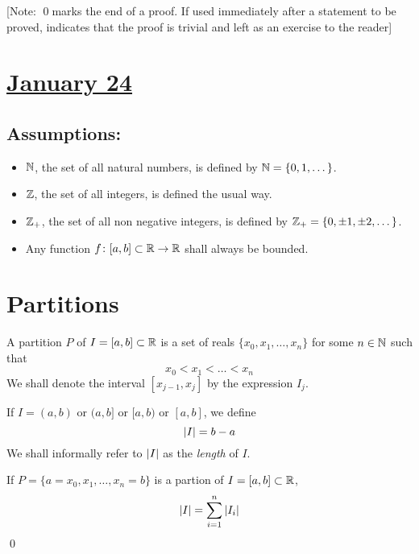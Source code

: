[Note: \qed \quad marks the end of a proof. If used immediately after a statement to be proved, indicates that the proof is trivial and left as an exercise to the reader]

\section*{\center\underline{January 24}}

\subsection*{Assumptions:}

\begin{itemize}
\item
  $\mathbb{N}$, the set of all natural numbers, is defined by $\mathbb{N} = \{0, 1, \dots \}$.

\item
  $\mathbb{Z}$, the set of all integers, is defined the usual way.
  
\item
  $\mathbb{Z}_+$, the set of all non negative integers, is defined by $\mathbb{Z}_+ = \{0, \pm 1, \pm 2, \dots \}$.

\item
  Any function $f \colon [a, b] \subset \mathbb{R} \to \mathbb{R}$ shall always be bounded.

\end{itemize}

\section{Partitions}

\begin{defn}
  A partition $P$ of $I = [a, b] \subset \mathbb{R}$ is a set of reals $\{x_0, x_1, \dots ,x_n \}$ for some $n \in \mathbb{N}$ such that
  \[
    x_0 < x_1 < \dots < x_n
  \]
  We shall denote the interval $[x_{j-1}, x_j]$ by the expression $I_j$.
\end{defn}

\begin{defn}
  If $I = (a, b)$ or $(a, b]$ or $[a, b)$ or $[a, b]$, we define
  \[
    \abs{I} = b - a
  \]
  We shall informally refer to $\abs{I}$ as the \textit{length} of $I$.
\end{defn}

\begin{claim}
  If $P = \{a = x_0, x_1, \dots ,x_n = b \}$ is a partion of $I = [a, b] \subset \mathbb{R}$,
  \[
    \abs{I} = \sum_{i=1}^n \abs{I_i}
  \]
  \hfill\qed
\end{claim}

